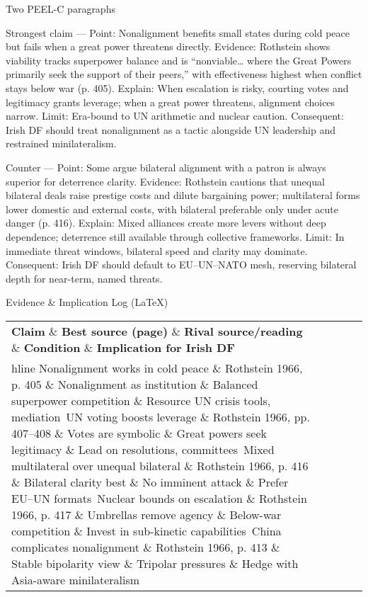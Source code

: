 Two PEEL-C paragraphs

Strongest claim — Point: Nonalignment benefits small states during cold peace but fails when a great power threatens directly.
Evidence: Rothstein shows viability tracks superpower balance and is “nonviable… where the Great Powers primarily seek the support of their peers,” with effectiveness highest when conflict stays below war (p. 405).
Explain: When escalation is risky, courting votes and legitimacy grants leverage; when a great power threatens, alignment choices narrow.
Limit: Era-bound to UN arithmetic and nuclear caution.
Consequent: Irish DF should treat nonalignment as a tactic alongside UN leadership and restrained minilateralism.

Counter — Point: Some argue bilateral alignment with a patron is always superior for deterrence clarity.
Evidence: Rothstein cautions that unequal bilateral deals raise prestige costs and dilute bargaining power; multilateral forms lower domestic and external costs, with bilateral preferable only under acute danger (p. 416).
Explain: Mixed alliances create more levers without deep dependence; deterrence still available through collective frameworks.
Limit: In immediate threat windows, bilateral speed and clarity may dominate.
Consequent: Irish DF should default to EU–UN–NATO mesh, reserving bilateral depth for near-term, named threats.

Evidence \& Implication Log (LaTeX)

\begin{tabular}{p{3.2cm}p{4.2cm}p{3.6cm}p{3.2cm}p{4.2cm}}
	\textbf{Claim} \& \textbf{Best source (page)} \& \textbf{Rival source/reading} \& \textbf{Condition} \& \textbf{Implication for Irish DF}\\hline
	Nonalignment works in cold peace \& Rothstein 1966, p. 405 \& Nonalignment as institution \& Balanced superpower competition \& Resource UN crisis tools, mediation\
	UN voting boosts leverage \& Rothstein 1966, pp. 407–408 \& Votes are symbolic \& Great powers seek legitimacy \& Lead on resolutions, committees\
	Mixed multilateral over unequal bilateral \& Rothstein 1966, p. 416 \& Bilateral clarity best \& No imminent attack \& Prefer EU–UN formats\
	Nuclear bounds on escalation \& Rothstein 1966, p. 417 \& Umbrellas remove agency \& Below-war competition \& Invest in sub-kinetic capabilities\
	China complicates nonalignment \& Rothstein 1966, p. 413 \& Stable bipolarity view \& Tripolar pressures \& Hedge with Asia-aware minilateralism\
\end{tabular}

